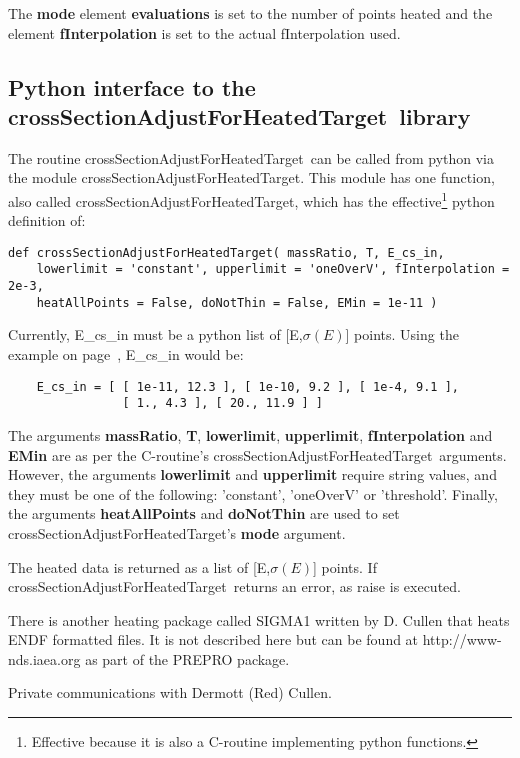 \documentclass[11pt,twoside]{article}
\def\CRoutine{crossSectionAdjustForHeatedTarget}
\def\CRoutineS{\CRoutine \ }
\begin{document}
The {\bf mode} element {\bf evaluations} is set to the number of points heated and the element {\bf fInterpolation} is set to the actual fInterpolation
used.

\subsection{Python interface to the \CRoutineS library}
The routine \CRoutineS can be called from python via the module crossSectionAdjustForHeatedTarget. This
module has one function, also called crossSectionAdjustForHeatedTarget, which has the effective\footnote{Effective
because it is also a C-routine implementing python functions.} python definition of:

\begin{verbatim}
def crossSectionAdjustForHeatedTarget( massRatio, T, E_cs_in, 
    lowerlimit = 'constant', upperlimit = 'oneOverV', fInterpolation = 2e-3,
    heatAllPoints = False, doNotThin = False, EMin = 1e-11 )
\end{verbatim}
Currently, E\_cs\_in must be a python list of [E,$\sigma(E)$] points. Using the example on page~\pageref{EcsinExample}, E\_cs\_in would be:
\begin{verbatim}
    E_cs_in = [ [ 1e-11, 12.3 ], [ 1e-10, 9.2 ], [ 1e-4, 9.1 ],
                [ 1., 4.3 ], [ 20., 11.9 ] ]
\end{verbatim}
The arguments {\bf massRatio}, {\bf T}, {\bf lowerlimit}, {\bf upperlimit}, {\bf fInterpolation} and {\bf EMin}
are as per the C-routine's \CRoutineS arguments. However, the arguments {\bf lowerlimit} and {\bf upperlimit} require string values, and
they must be one of the following: 'constant', 'oneOverV' or 'threshold'. Finally, the arguments {\bf heatAllPoints}
and {\bf doNotThin} are used to set \CRoutine's {\bf mode} argument.

The heated data is returned as a list of [E,$\sigma(E)$] points. If \CRoutineS returns an error, as raise is executed.

\begin{thebibliography}{99}


 There is another heating package called SIGMA1 written by D. Cullen that heats ENDF formatted files. It is not described here but 
can be found at http://www-nds.iaea.org as part of the PREPRO package.

 Private communications with Dermott (Red) Cullen.

\end{thebibliography}
\end{document}
